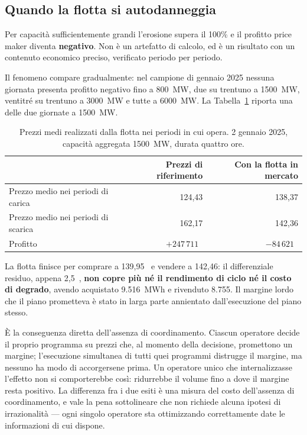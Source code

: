 \subsection{Quando la flotta si autodanneggia}
\label{sec:autodanno}

Per capacit\`a sufficientemente grandi l'erosione supera il 100\% e il profitto price maker
diventa \textbf{negativo}. Non \`e un artefatto di calcolo, ed \`e un risultato con un
contenuto economico preciso, verificato periodo per periodo.

Il fenomeno compare gradualmente: nel campione di gennaio 2025 nessuna giornata presenta
profitto negativo fino a 800~MW, due su trentuno a 1500~MW, ventitr\'e su trentuno a 3000~MW e
tutte a 6000~MW. La Tabella~\ref{tab:autodanno} riporta una delle due giornate a 1500~MW.

\begin{table}[H]
\centering
\caption{Prezzi medi realizzati dalla flotta nei periodi in cui opera. 2 gennaio 2025,
         capacit\`a aggregata 1500~MW, durata quattro ore.}
\label{tab:autodanno}
\begin{tabular}{@{}lrr@{}}
\toprule
 & \textbf{Prezzi di riferimento} & \textbf{Con la flotta in mercato} \\
\midrule
Prezzo medio nei periodi di carica  & 124{,}43 & 138{,}37 \\
Prezzo medio nei periodi di scarica & 162{,}17 & 142{,}36 \\
\midrule
Profitto & $+247\,711$~\eur{} & $-84\,621$~\eur{} \\
\bottomrule
\end{tabular}
\end{table}

La flotta finisce per comprare a 139{,}95~\euromwh{} e vendere a 142{,}46: il differenziale
residuo, appena 2{,}5~\euromwh{}, \textbf{non copre pi\`u n\'e il rendimento di ciclo n\'e il
costo di degrado}, avendo acquistato 9.516~MWh e rivenduto 8.755. Il margine lordo che il
piano prometteva \`e stato in larga parte annientato dall'esecuzione del piano stesso.

\`E la conseguenza diretta dell'assenza di coordinamento. Ciascun operatore decide il proprio
programma su prezzi che, al momento della decisione, promettono un margine; l'esecuzione
simultanea di tutti quei programmi distrugge il margine, ma nessuno ha modo di accorgersene
prima. Un operatore unico che internalizzasse l'effetto non si comporterebbe cos\`i: ridurrebbe
il volume fino a dove il margine resta positivo. La differenza fra i due esiti \`e una misura
del costo dell'assenza di coordinamento, e vale la pena sottolineare che non richiede alcuna
ipotesi di irrazionalit\`a — ogni singolo operatore sta ottimizzando correttamente date le
informazioni di cui dispone.

